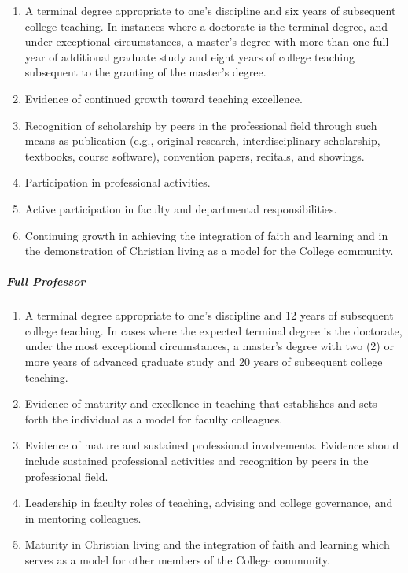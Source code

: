 					\begin{enumerate}[label=\alph*)]
						\item{A terminal degree appropriate to one's discipline and six years of subsequent college teaching. In instances where a doctorate is the terminal degree, and under exceptional circumstances, a master's degree with more than one full year of additional graduate study and eight years of college teaching subsequent to the granting of the master's degree.}
						\item{Evidence of continued growth toward teaching excellence.}
						\item{Recognition of scholarship by peers in the professional field through such means as publication (e.g., original research, interdisciplinary scholarship, textbooks, course software), convention papers, recitals, and showings.}
						\item{Participation in professional activities.}
						\item{Active participation in faculty and departmental responsibilities.}
						\item{Continuing growth in achieving the integration of faith and learning and in the demonstration of Christian living as a model for the College community.}
					\end{enumerate}
				\subparagraph{Full Professor}
					\begin{enumerate}[label=\alph*)]
						\item{A terminal degree appropriate to one's discipline and 12 years of subsequent college teaching. In cases where the expected terminal degree is the doctorate, under the most exceptional circumstances, a master's degree with two (2) or more years of advanced graduate study and 20 years of subsequent college teaching.}
						\item{Evidence of maturity and excellence in teaching that establishes and sets forth the individual as a model for faculty colleagues.}
						\item{Evidence of mature and sustained professional involvements. Evidence should include sustained professional activities and recognition by peers in the professional field.}
						\item{Leadership in faculty roles of teaching, advising and college governance, and in mentoring colleagues.}
						\item{Maturity in Christian living and the integration of faith and learning which serves as a model for other members of the College community.}
					\end{enumerate}
